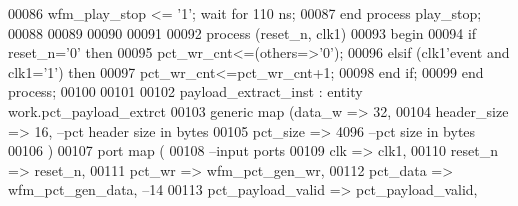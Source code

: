 \begin{DoxyCode}
00086         \textcolor{vhdlchar}{wfm_play_stop} \textcolor{vhdlchar}{<=} \textcolor{vhdlchar}{'}\textcolor{vhdllogic}{}\textcolor{vhdllogic}{1}\textcolor{vhdlchar}{'}; \textcolor{keywordflow}{wait} \textcolor{keywordflow}{for} \textcolor{vhdllogic}{}\textcolor{vhdllogic}{110} \textcolor{vhdlchar}{ns};
00087     \textcolor{keywordflow}{end} \textcolor{keywordflow}{process} \textcolor{vhdlchar}{play\_stop};
00088 
00089 
00090 
00091 
00092 \textcolor{keywordflow}{process} (reset_n, clk1) 
00093 \textcolor{vhdlkeyword}{    begin }
00094         \textcolor{keywordflow}{if} \textcolor{vhdlchar}{reset_n}\textcolor{vhdlchar}{=}\textcolor{vhdlchar}{'}\textcolor{vhdllogic}{}\textcolor{vhdllogic}{0}\textcolor{vhdlchar}{'} \textcolor{keywordflow}{then} 
00095             \textcolor{vhdlchar}{pct_wr_cnt}\textcolor{vhdlchar}{<=}\textcolor{vhdlchar}{(}\textcolor{keywordflow}{others}\textcolor{vhdlchar}{=}\textcolor{vhdlchar}{>}\textcolor{vhdlchar}{'}\textcolor{vhdllogic}{}\textcolor{vhdllogic}{0}\textcolor{vhdlchar}{'}\textcolor{vhdlchar}{)};
00096         \textcolor{keywordflow}{elsif} \textcolor{vhdlchar}{(}\textcolor{vhdlchar}{clk1}\textcolor{vhdlchar}{'}\textcolor{vhdlkeyword}{event} \textcolor{keywordflow}{and} \textcolor{vhdlchar}{clk1}\textcolor{vhdlchar}{=}\textcolor{vhdlchar}{'}\textcolor{vhdllogic}{}\textcolor{vhdllogic}{1}\textcolor{vhdlchar}{'}\textcolor{vhdlchar}{)} \textcolor{keywordflow}{then} 
00097             \textcolor{vhdlchar}{pct_wr_cnt}\textcolor{vhdlchar}{<=}\textcolor{vhdlchar}{pct_wr_cnt}\textcolor{vhdlchar}{+}\textcolor{vhdllogic}{}\textcolor{vhdllogic}{1};
00098         \textcolor{keywordflow}{end} \textcolor{keywordflow}{if};
00099 \textcolor{keywordflow}{end} \textcolor{keywordflow}{process};
00100 
00101 
00102 payload\_extract\_inst : \textcolor{keywordflow}{entity} work.pct_payload_extrct 
00103     \textcolor{keywordflow}{generic} \textcolor{keywordflow}{map} (data_w         => \textcolor{vhdllogic}{32},
00104                     header_size     => \textcolor{vhdllogic}{16},\textcolor{keyword}{  --pct header size in bytes }
00105                     pct_size            => \textcolor{vhdllogic}{4096} \textcolor{keyword}{--pct size in bytes}
00106         \textcolor{vhdlchar}{)}
00107   \textcolor{keywordflow}{port} \textcolor{keywordflow}{map} (
00108 \textcolor{keyword}{      --input ports }
00109         clk                     => clk1,
00110         reset_n                 => reset_n,
00111         pct_wr                  => wfm_pct_gen_wr,
00112         pct_data                    => wfm_pct_gen_data,\textcolor{keyword}{ --14}
00113         pct_payload_valid       => pct_payload_valid,

\end{DoxyCode}
